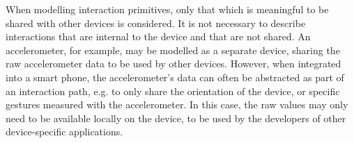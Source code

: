 





% 
% 
% 

When modelling interaction primitives, only that which is meaningful to be shared with other devices is considered. It is not necessary to describe interactions that are internal to the device and that are not shared. An accelerometer, for example, may be modelled as a separate device, sharing the raw accelerometer data to be used by other devices. However, when integrated into a smart phone, the accelerometer's data can often be abstracted as part of an interaction path, e.g. to only share the orientation of the device, or specific gestures measured with the accelerometer. In this case, the raw values may only need to be available locally on the device, to be used by the developers of other device-specific applications. 


